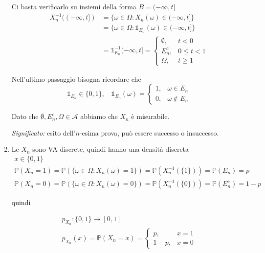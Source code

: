 \begin{enumerate}
Ci basta verificarlo su insiemi della forma $B=( -\infty ,t]$\begin{equation*}
\begin{aligned}
X_{n}^{-1}(( -\infty ,t]) & =\{\omega \in \Omega :X_{n}( \omega ) \in ( -\infty ,t]\}\\
 & =\{\omega \in \Omega :\mathbb{1}_{E_{n}}( \omega ) \in ( -\infty ,t]\}\\
 & =\mathbb{1}_{E_{n}}^{-1}( -\infty ,t] =\begin{cases}
\emptyset , & t< 0\\
E_{n}^{c} , & 0\leq t< 1\\
\Omega , & t\geq 1
\end{cases}
\end{aligned}
\end{equation*}

Nell'ultimo passaggio bisogna ricordare che\begin{equation*}
\mathbb{1}_{E_{n}} \in \{0,1\} ,\ \ \ \ \mathbb{1}_{E_{n}}( \omega ) =\begin{cases}
1, & \omega \in E_{n}\\
0, & \omega \notin E_{n}
\end{cases}
\end{equation*}

Dato che $\emptyset ,E_{n}^{c} ,\Omega \in \mathcal{A}$ abbiamo che $X_{n}$ è misurabile.

\textit{Significato:} esito dell'$n$-esima prova, può essere successo o insuccesso.
\item Le $X_{n}$ sono VA discrete, quindi hanno una densità discreta\begin{gather*}
x\in \{0,1\}\\
\mathbb{P}( X_{n} =1) =\mathbb{P}(\{\omega \in \Omega :X_{n}( \omega ) =1\}) =\mathbb{P}\left( X_{n}^{-1}(\{1\})\right) =\mathbb{P}( E_{n}) =p\\
\mathbb{P}( X_{n} =0) =\mathbb{P}(\{\omega \in \Omega :X_{n}( \omega ) =0\}) =\mathbb{P}\left( X_{n}^{-1}(\{0\})\right) =\mathbb{P}\left( E_{n}^{c}\right) =1-p
\end{gather*}

quindi

\begin{gather*}
p_{X_{n}} :\{0,1\}\rightarrow [ 0,1]\\
p_{X_{n}}( x) =\mathbb{P}( X_{n} =x) =\begin{cases}
p, & x=1\\
1-p, & x=0
\end{cases}
\end{gather*}


\end{enumerate}
